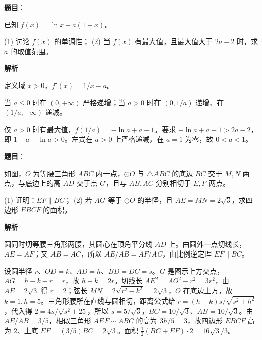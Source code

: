 \begin{answer}

\textbf{题目}：

已知 $f(x)=\ln x+a(1-x)$。

(1) 讨论 $f(x)$ 的单调性；  
(2) 当 $f(x)$ 有最大值，且最大值大于 $2a-2$ 时，求 $a$ 的取值范围。

\textbf{解析}

定义域 $x>0$，$f'(x)=1/x-a$。


当 $a\le0$ 时在 $(0,+\infty)$ 严格递增；当 $a>0$ 时在 $(0,1/a)$ 递增、在 $(1/a,+\infty)$ 递减。


仅 $a>0$ 时有最大值，$f(1/a)=-\ln a+a-1$。要求 $-\ln a+a-1>2a-2$，即 $1-a-\ln a>0$。左式在 $a>0$ 上严格递减，在 $a=1$ 为零，故 $0<a<1$。



\end{answer}
\begin{answer}

\textbf{题目}：

如图，$O$ 为等腰三角形 $ABC$ 内一点，$\odot O$ 与 $\triangle ABC$ 的底边 $BC$ 交于 $M,N$ 两点，与底边上的高 $AD$ 交于点 $G$，且与 $AB,AC$ 分别相切于 $E,F$ 两点。

(1) 证明：$EF\parallel BC$；  
(2) 若 $AG$ 等于 $\odot O$ 的半径，且 $AE=MN=2\sqrt3$，求四边形 $EBCF$ 的面积。
\nopagebreak[4]
\begin{center}\end{center}
\nopagebreak[4]
\textbf{解析}


圆同时切等腰三角形两腰，其圆心在顶角平分线 $AD$ 上。由圆外一点切线长，$AE=AF$；又 $AB=AC$，所以 $AE/AB=AF/AC$，由比例逆定理 $EF\parallel BC$。


设圆半径 $r$、$OD=k$、$AD=h$、$BD=DC=s$。$G$ 是图示上方交点，$AG=h-k-r=r$，故 $h-k=2r$。切线长 $AE^2=AO^2-r^2=3r^2$，由 $AE=2\sqrt3$ 得 $r=2$；弦长 $MN=2\sqrt{r^2-k^2}=2\sqrt3$，$O$ 在底边上方，故 $k=1,h=5$。三角形腰所在直线与圆相切，距离公式给 $r=(h-k)s/\sqrt{s^2+h^2}$，代入得 $2=4s/\sqrt{s^2+25}$，所以 $s=5/\sqrt3$，$BC=10/\sqrt3$、$AB=10/\sqrt3$。由 $AE/AB=3/5$，相似三角形 $AEF\sim ABC$ 的高为 $3h/5=3$，故四边形 $EBCF$ 高为 $2$、上底 $EF=(3/5)BC=2\sqrt3$。面积 $\frac12(BC+EF)\cdot2=16\sqrt3/3$。



\end{answer}
